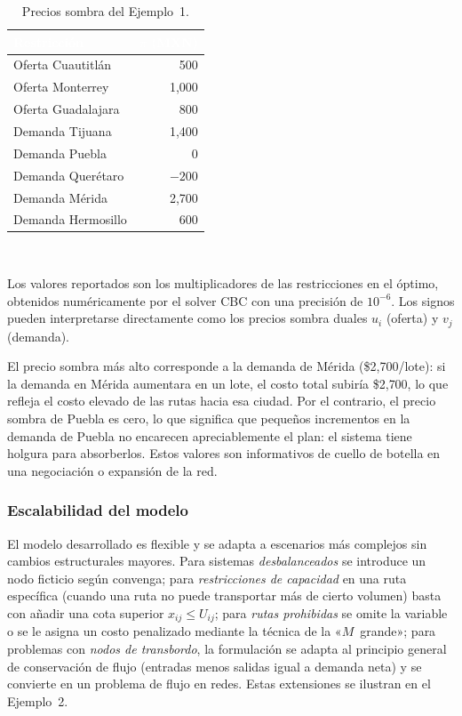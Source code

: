 \documentclass[10pt,letterpaper,twocolumn]{article}
\begin{document}
\begin{table}[!h]
\caption{Precios sombra del Ejemplo~1.}
\centering
\small
\begin{tabular}{l r}
\arrayrulecolor{infotec}\toprule
\rowcolor{infotec}\textcolor{white}{\textbf{Restricción}} & \textcolor{white}{\textbf{$\pi$ (MXN)}} \\
\midrule
Oferta Cuautitlán  & 500 \\
Oferta Monterrey   & 1,000 \\
Oferta Guadalajara & 800 \\
Demanda Tijuana    & 1,400 \\
Demanda Puebla     & 0 \\
Demanda Querétaro  & $-200$ \\
Demanda Mérida     & 2,700 \\
Demanda Hermosillo & 600 \\
\bottomrule
\end{tabular}
\\
\raggedright\fontsize{6.5pt}{7.5pt}\selectfont Los valores reportados son los multiplicadores de las restricciones en el óptimo, obtenidos numéricamente por el solver CBC con una precisión de $10^{-6}$. Los signos pueden interpretarse directamente como los precios sombra duales $u_i$ (oferta) y $v_j$ (demanda).
\end{table}

El precio sombra más alto corresponde a la demanda de Mérida (\$2{,}700/lote): si la demanda en Mérida aumentara en un lote, el costo total subiría \$2{,}700, lo que refleja el costo elevado de las rutas hacia esa ciudad. Por el contrario, el precio sombra de Puebla es cero, lo que significa que pequeños incrementos en la demanda de Puebla no encarecen apreciablemente el plan: el sistema tiene holgura para absorberlos. Estos valores son informativos de cuello de botella en una negociación o expansión de la red.

\subsubsection{Escalabilidad del modelo}
El modelo desarrollado es flexible y se adapta a escenarios más complejos sin cambios estructurales mayores. Para sistemas \emph{desbalanceados} se introduce un nodo ficticio según convenga; para \emph{restricciones de capacidad} en una ruta específica (cuando una ruta no puede transportar más de cierto volumen) basta con añadir una cota superior $x_{ij} \leq U_{ij}$; para \emph{rutas prohibidas} se omite la variable o se le asigna un costo penalizado mediante la técnica de la «$M$~grande»; para problemas con \emph{nodos de transbordo}, la formulación se adapta al principio general de conservación de flujo (entradas menos salidas igual a demanda neta) y se convierte en un problema de flujo en redes. Estas extensiones se ilustran en el Ejemplo~2.
\end{document}
